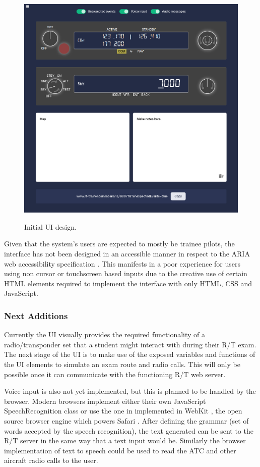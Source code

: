 \begin{figure}[H]
    \centering
	\includegraphics[scale = 0.47]{../document-resources/images/Project-Initial-UI.png}
    \label{initialui}
    \caption{Initial UI design.}
\end{figure}

Given that the system's users are expected to mostly be trainee pilots, the interface has not been designed in an accessible manner in respect to the ARIA web accessibility specification \cite{ARIA}. This manifests in a poor experience for users using non cursor or touchscreen based inputs due to the creative use of certain HTML elements required to implement the interface with only HTML, CSS and JavaScript.

\subsubsection{Next Additions}
Currently the UI visually provides the required functionality of a radio/transponder set that a student might interact with during their R/T exam. The next stage of the UI is to make use of the exposed variables and functions of the UI elements to simulate an exam route and radio calls. This will only be possible once it can communicate with the functioning R/T web server.

Voice input is also not yet implemented, but this is planned to be handled by the browser. Modern browsers implement either their own JavaScript SpeechRecognition class or use the one in implemented in WebKit \cite{MDNWebSpeech}, the open source browser engine which powers Safari \cite{WebKit}. After defining the grammar (set of words accepted by the speech recognition), the text generated can be sent to the R/T server in the same way that a text input would be. Similarly the browser implementation of text to speech could be used to read the ATC and other aircraft radio calls to the user.

